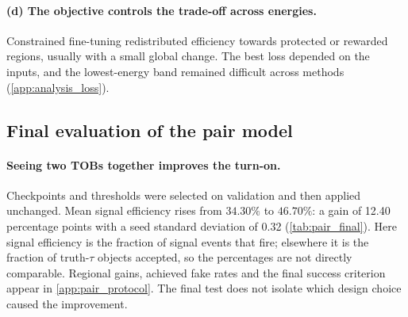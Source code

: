 \paragraph{(d) The objective controls the trade-off across energies.}
Constrained fine-tuning redistributed efficiency towards protected or rewarded regions, usually with a small global change. The best loss depended on the inputs, and the lowest-energy band remained difficult across methods (\cref{app:analysis_loss}).

\FloatBarrier
\subsection{Final evaluation of the pair model}
\label{sec:pair_results}
\paragraph{Seeing two TOBs together improves the turn-on.}
Checkpoints and thresholds were selected on validation and then applied unchanged.
Mean signal efficiency rises from $34.30\%$ to $46.70\%$: a gain of 12.40
percentage points with a seed standard deviation of 0.32 (\cref{tab:pair_final}).
Here signal efficiency is the fraction of signal events that fire; elsewhere
it is the fraction of truth-$\tau$ objects accepted, so the percentages are not
directly comparable. Regional gains, achieved fake rates and the final success
criterion appear in \cref{app:pair_protocol}. The final test does not isolate
which design choice caused the improvement.

\begin{table}[H]
  \centering
  \caption{Final pair-model test efficiencies and achieved event fake rates;
  baseline fake rate: $0.4842\%$. Paired differences use $14{,}509$ signal events.}
  \label{tab:pair_final}
  \small
  \setlength{\tabcolsep}{7pt}
  
\end{table}
